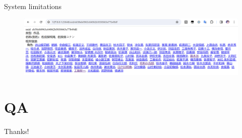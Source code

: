\documentclass{beamer}
\begin{document}
\begin{frame}{System limitations}
    \begin{figure}[l]
        \centering
        \includegraphics[height=.5\textheight]{pic/13.png}
    \end{figure}
\end{frame}

\section{QA}

\begin{frame}
    \begin{center}
        {\Huge\calligra Thanks!}
    \end{center}
\end{frame}
\end{document}

